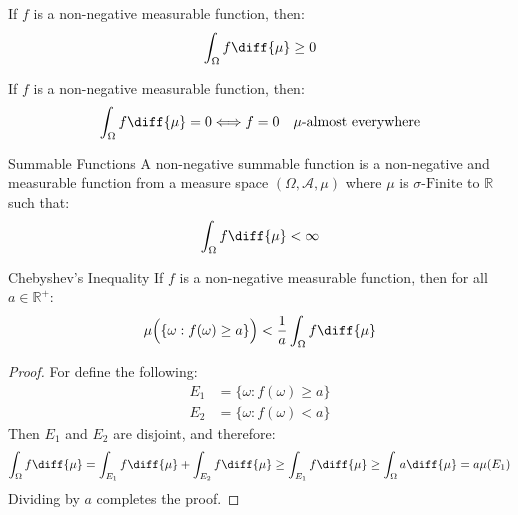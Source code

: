     \begin{theorem}
        If $f$ is a non-negative measurable function, then:
        \begin{equation}
            \int_{\Omega}f\diff{\mu}\geq{0}
        \end{equation}
    \end{theorem}
    \begin{theorem}
        If $f$ is a non-negative measurable function, then:
        \begin{equation}
            \int_{\Omega}f\diff{\mu}=0
            \Longleftrightarrow{f=0}
            \quad\mu\textrm{-almost everywhere}
        \end{equation}
    \end{theorem}
    \begin{ldefinition}{Summable Functions}
        A non-negative summable function is a non-negative
        and measurable function from
        a measure space $(\Omega,\mathcal{A},\mu)$ where
        $\mu$ is $\sigma\textrm{-Finite}$ to $\mathbb{R}$
        such that:
        \begin{equation}
            \int_{\Omega}f\diff{\mu}<\infty
        \end{equation}
    \end{ldefinition}
    \begin{ltheorem}{Chebyshev's Inequality}
        If $f$ is a non-negative measurable function, then for
        all $a\in\mathbb{R}^{+}$:
        \begin{equation}
            \mu\Big(\{\omega:f(\omega)\geq{a}\}\Big)
            <\frac{1}{a}\int_{\Omega}f\diff{\mu}
        \end{equation}
    \end{ltheorem}
    \begin{proof}
        For define the following:
        \begin{align}
            E_{1}&=\{\omega:f(\omega)\geq{a}\}\\
            E_{2}&=\{\omega:f(\omega)<a\}
        \end{align}
        Then $E_{1}$ and $E_{2}$ are disjoint, and therefore:
        \begin{equation}
            \int_{\Omega}f\diff{\mu}=
            \int_{E_{1}}f\diff{\mu}+
            \int_{E_{2}}f\diff{\mu}
            \geq\int_{E_{1}}f\diff{\mu}
            \geq\int_{\Omega}a\diff{\mu}
            =a\mu(E_{1})
        \end{equation}
        Dividing by $a$ completes the proof.
    \end{proof}
